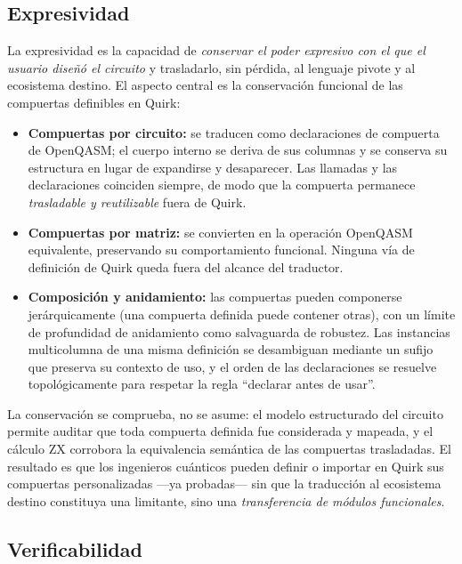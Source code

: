 \documentclass[11pt,a4paper]{article}
\begin{document}
\subsection{Expresividad}

La expresividad es la capacidad de \emph{conservar el poder expresivo con el que el usuario
diseñó el circuito} y trasladarlo, sin pérdida, al lenguaje pivote y al ecosistema destino.
El aspecto central es la conservación funcional de las compuertas definibles en Quirk:

\begin{itemize}[leftmargin=1.6em]
  \item \textbf{Compuertas por circuito:} se traducen como declaraciones de compuerta de
        OpenQASM; el cuerpo interno se deriva de sus columnas y se conserva su estructura en
        lugar de expandirse y desaparecer. Las llamadas y las declaraciones coinciden
        siempre, de modo que la compuerta permanece \emph{trasladable y reutilizable} fuera
        de Quirk.
  \item \textbf{Compuertas por matriz:} se convierten en la operación OpenQASM equivalente,
        preservando su comportamiento funcional. Ninguna vía de definición de Quirk queda
        fuera del alcance del traductor.
  \item \textbf{Composición y anidamiento:} las compuertas pueden componerse jerárquicamente
        (una compuerta definida puede contener otras), con un límite de profundidad de
        anidamiento como salvaguarda de robustez. Las instancias multicolumna de una misma
        definición se desambiguan mediante un sufijo que preserva su contexto de uso, y el
        orden de las declaraciones se resuelve topológicamente para respetar la regla
        ``declarar antes de usar''.
\end{itemize}

La conservación se comprueba, no se asume: el modelo estructurado del circuito permite
auditar que toda compuerta definida fue considerada y mapeada, y el cálculo ZX corrobora la
equivalencia semántica de las compuertas trasladadas. El resultado es que los ingenieros
cuánticos pueden definir o importar en Quirk sus compuertas personalizadas ---ya probadas---
sin que la traducción al ecosistema destino constituya una limitante, sino una
\emph{transferencia de módulos funcionales}.

\subsection{Verificabilidad}
\end{document}
